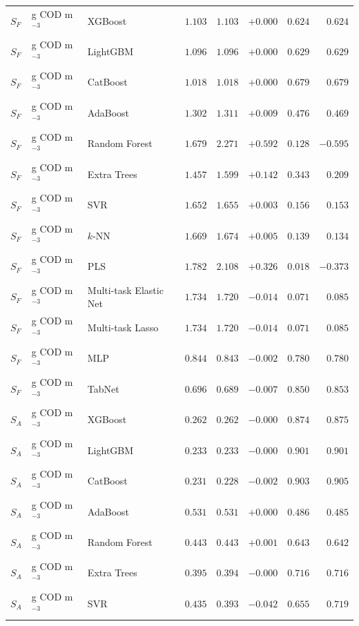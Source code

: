 \begin{longtable}{llp{3.1cm}rrrrr}
$S_{F}$ & g COD m$^{-3}$ & XGBoost & $1.103$ & $1.103$ & $+0.000$ & $0.624$ & $0.624$ \\
$S_{F}$ & g COD m$^{-3}$ & LightGBM & $1.096$ & $1.096$ & $+0.000$ & $0.629$ & $0.629$ \\
$S_{F}$ & g COD m$^{-3}$ & CatBoost & $1.018$ & $1.018$ & $+0.000$ & $0.679$ & $0.679$ \\
$S_{F}$ & g COD m$^{-3}$ & AdaBoost & $1.302$ & $1.311$ & $+0.009$ & $0.476$ & $0.469$ \\
$S_{F}$ & g COD m$^{-3}$ & Random Forest & $1.679$ & $2.271$ & $+0.592$ & $0.128$ & $-0.595$ \\
$S_{F}$ & g COD m$^{-3}$ & Extra Trees & $1.457$ & $1.599$ & $+0.142$ & $0.343$ & $0.209$ \\
$S_{F}$ & g COD m$^{-3}$ & SVR & $1.652$ & $1.655$ & $+0.003$ & $0.156$ & $0.153$ \\
$S_{F}$ & g COD m$^{-3}$ & $k$-NN & $1.669$ & $1.674$ & $+0.005$ & $0.139$ & $0.134$ \\
$S_{F}$ & g COD m$^{-3}$ & PLS & $1.782$ & $2.108$ & $+0.326$ & $0.018$ & $-0.373$ \\
$S_{F}$ & g COD m$^{-3}$ & Multi-task Elastic Net & $1.734$ & $1.720$ & $-0.014$ & $0.071$ & $0.085$ \\
$S_{F}$ & g COD m$^{-3}$ & Multi-task Lasso & $1.734$ & $1.720$ & $-0.014$ & $0.071$ & $0.085$ \\
$S_{F}$ & g COD m$^{-3}$ & MLP & $0.844$ & $0.843$ & $-0.002$ & $0.780$ & $0.780$ \\
$S_{F}$ & g COD m$^{-3}$ & TabNet & $0.696$ & $0.689$ & $-0.007$ & $0.850$ & $0.853$ \\
$S_{A}$ & g COD m$^{-3}$ & XGBoost & $0.262$ & $0.262$ & $-0.000$ & $0.874$ & $0.875$ \\
$S_{A}$ & g COD m$^{-3}$ & LightGBM & $0.233$ & $0.233$ & $-0.000$ & $0.901$ & $0.901$ \\
$S_{A}$ & g COD m$^{-3}$ & CatBoost & $0.231$ & $0.228$ & $-0.002$ & $0.903$ & $0.905$ \\
$S_{A}$ & g COD m$^{-3}$ & AdaBoost & $0.531$ & $0.531$ & $+0.000$ & $0.486$ & $0.485$ \\
$S_{A}$ & g COD m$^{-3}$ & Random Forest & $0.443$ & $0.443$ & $+0.001$ & $0.643$ & $0.642$ \\
$S_{A}$ & g COD m$^{-3}$ & Extra Trees & $0.395$ & $0.394$ & $-0.000$ & $0.716$ & $0.716$ \\
$S_{A}$ & g COD m$^{-3}$ & SVR & $0.435$ & $0.393$ & $-0.042$ & $0.655$ & $0.719$ \\

\end{longtable}
